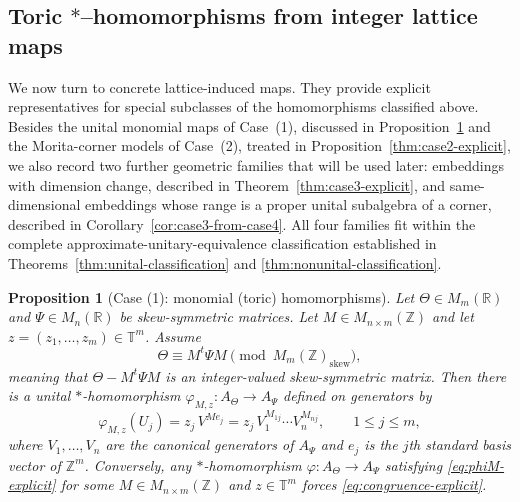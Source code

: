 \documentclass[11pt]{amsart}
\newtheorem{proposition}[theorem]{Proposition}
\theoremstyle{definition}
\theoremstyle{remark}
\newcommand{\T}{\mathbb{T}}
\newcommand{\Z}{\mathbb{Z}}
\newcommand{\R}{\mathbb{R}}
\begin{document}
\subsection{Toric \texorpdfstring{$\ast$}{*}--homomorphisms from integer lattice maps}\label{toric}

We now turn to concrete lattice-induced maps. They provide explicit representatives for special subclasses of the homomorphisms classified above. Besides the unital monomial maps of Case~(1), discussed in Proposition~\ref{prop:toric-explicit} and the Morita-corner models of Case~(2), treated in Proposition~\ref{thm:case2-explicit}, we also record two further geometric families that will be used later: embeddings with dimension change, described in Theorem~\ref{thm:case3-explicit}, and same-dimensional embeddings whose range is a proper unital subalgebra of a corner, described in Corollary~\ref{cor:case3-from-case4}. All four families fit within the complete approximate-unitary-equivalence classification established in Theorems~\ref{thm:unital-classification} and \ref{thm:nonunital-classification}.

\begin{proposition}[Case (1): monomial (toric) homomorphisms]\label{prop:toric-explicit}
Let $\Theta\in M_m(\R)$ and $\Psi\in M_n(\R)$ be skew-symmetric matrices.
Let $M\in M_{n\times m}(\Z)$ and let $z=(z_1,\dots,z_m)\in\T^m$.
Assume
\begin{equation}\label{eq:congruence-explicit}
\Theta \equiv M^t\Psi M \pmod{M_m(\Z)_{\mathrm{skew}}},
\end{equation}
meaning that $\Theta- M^t\Psi M$ is an integer-valued skew-symmetric matrix. Then there is a unital $*$-homomorphism $\varphi_{M,z}\colon A_{\Theta}\longrightarrow A_{\Psi}$
defined on generators by
\begin{equation}\label{eq:phiM-explicit}
\varphi_{M,z}(U_j)=z_j\,V^{Me_j}=z_j\,V_1^{M_{1j}}\cdots V_n^{M_{nj}},
\qquad 1\le j\le m,
\end{equation}
where $V_1,\dots,V_n$ are the canonical generators of $A_{\Psi}$ and $e_j$ is the $j$th standard basis vector of $\Z^m$. Conversely, any $*$-homomorphism $\varphi\colon A_{\Theta}\to A_{\Psi}$ satisfying \eqref{eq:phiM-explicit} for some $M\in M_{n\times m}(\Z)$ and $z\in\T^m$ forces \eqref{eq:congruence-explicit}.
\end{proposition}
\end{document}
